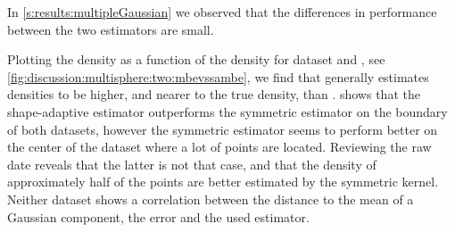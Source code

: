
	In \cref{s:results:multipleGaussian} we observed that the differences in performance between the two estimators are small. 

	Plotting the \mbe density as a function of the \sambe density for dataset \ferdosiTwo and \baakmanTwo, see \cref{fig:discussion:multisphere:two:mbevssambe}, we find that \sambe generally estimates densities to be higher, and nearer to the true density, than \mbe.  shows that the shape-adaptive estimator outperforms the symmetric estimator on the boundary of both datasets, however the symmetric estimator seems to perform better on the center of the dataset where a lot of points are located. Reviewing the raw date reveals that the latter is not that case, and that the density of approximately half of the points are better estimated by the symmetric kernel.  Neither dataset shows a correlation between the distance to the mean of a Gaussian component, the error and the used estimator.

